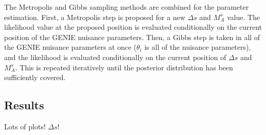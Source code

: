     The Metropolis and Gibbs sampling methods are combined for the parameter
    estimation.  First, a Metropolis step is proposed for a new $\Delta s$ and
    $M_A^s$ value. The likelihood value at the proposed position is evaluated
    conditionally on the current position of the GENIE nuisance parameters.
    Then, a Gibbs step is taken in all of the GENIE nuisance parameters at once
    ($\theta_i$ is all of the nuisance parameters), and the likelihood is
    evaluated conditionally on the current position of $\Delta s$ and $M_A^s$.
    This is repeated iteratively until the posterior distribution has been
    sufficiently covered.

\subsection{Results}\label{sec:results}
  Lots of plots! $\Delta s$!


